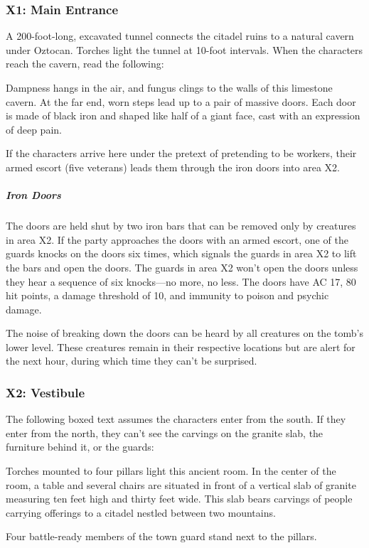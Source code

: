 \documentclass[10pt,a4paper,twoside,bg=print,twocolumn,openany,nodeprecatedcode]{dndbook}
\begin{document}
\subsubsection{X1: Main Entrance}
A 200-foot-long, excavated tunnel connects the citadel ruins to a natural cavern under Oztocan. Torches light the tunnel at 10-foot intervals. When the characters reach the cavern, read the following:

\begin{DndReadAloud}{}
Dampness hangs in the air, and fungus clings to the walls of this limestone cavern. At the far end, worn steps lead up to a pair of massive doors. Each door is made of black iron and shaped like half of a giant face, cast with an expression of deep pain.

\end{DndReadAloud}

If the characters arrive here under the pretext of pretending to be workers, their armed escort (five veterans) leads them through the iron doors into area X2.

\subparagraph{Iron Doors}
The doors are held shut by two iron bars that can be removed only by creatures in area X2. If the party approaches the doors with an armed escort, one of the guards knocks on the doors six times, which signals the guards in area X2 to lift the bars and open the doors. The guards in area X2 won't open the doors unless they hear a sequence of six knocks—no more, no less. The doors have AC 17, 80 hit points, a damage threshold of 10, and immunity to poison and psychic damage.

The noise of breaking down the doors can be heard by all creatures on the tomb's lower level. These creatures remain in their respective locations but are alert for the next hour, during which time they can't be surprised.

\subsubsection{X2: Vestibule}
The following boxed text assumes the characters enter from the south. If they enter from the north, they can't see the carvings on the granite slab, the furniture behind it, or the guards:

\begin{DndReadAloud}{}
Torches mounted to four pillars light this ancient room. In the center of the room, a table and several chairs are situated in front of a vertical slab of granite measuring ten feet high and thirty feet wide. This slab bears carvings of people carrying offerings to a citadel nestled between two mountains.

Four battle-ready members of the town guard stand next to the pillars.

\end{DndReadAloud}
\end{document}

